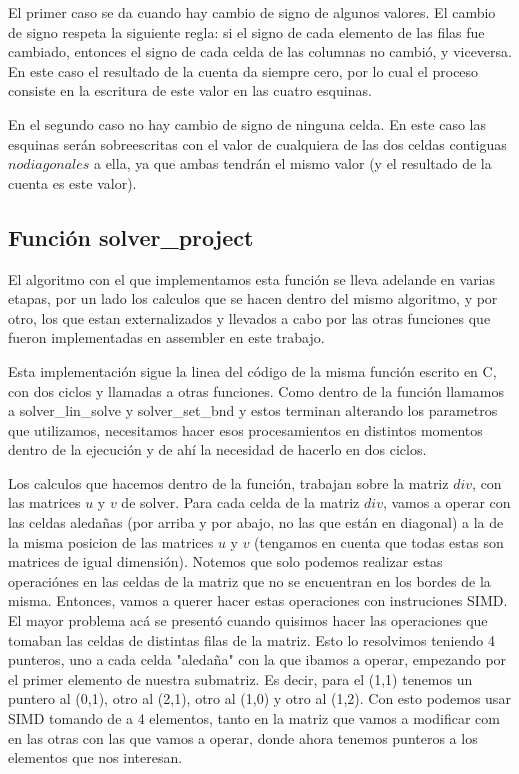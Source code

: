 \par El primer caso se da cuando hay cambio de signo de algunos valores. El cambio de signo respeta la siguiente regla: si el signo de cada elemento de las filas fue cambiado, entonces el signo de cada celda de las columnas no cambió, y viceversa. En este caso el resultado de la cuenta da siempre cero, por lo cual el proceso consiste en la escritura de este valor en las cuatro esquinas.\newline
\par En el segundo caso no hay cambio de signo de ninguna celda. En este caso las esquinas serán sobreescritas con el valor de cualquiera de las dos celdas contiguas \(no diagonales\) a ella, ya que ambas tendrán el mismo valor (y el resultado de la cuenta es este valor).\newline


\subsection{Función solver\_project}
\par El algoritmo con el que implementamos esta función se lleva adelande en varias etapas, por un lado los calculos que se hacen dentro del mismo algoritmo, y por otro, los que estan externalizados y llevados a cabo por las otras funciones que fueron implementadas en assembler en este trabajo.\newline

\par Esta implementación sigue la linea del código de la misma función escrito en C, con dos ciclos y llamadas a otras funciones. Como dentro de la función llamamos a solver\_lin\_solve y solver\_set\_bnd y estos terminan alterando los parametros que utilizamos, necesitamos hacer esos procesamientos en distintos momentos dentro de la ejecución y de ahí la necesidad de hacerlo en dos ciclos.\newline

\par Los calculos que hacemos dentro de la función, trabajan sobre la matriz $div$, con las matrices $u$ y $v$ de solver. Para cada celda de la matriz $div$, vamos a operar con las celdas aledañas (por arriba y por abajo, no las que están en diagonal) a la de la misma posicion de las matrices $u$ y $v$ (tengamos en cuenta que todas estas son matrices de igual dimensión).
Notemos que solo podemos realizar estas operaciónes en las celdas de la matriz que no se encuentran en los bordes de la misma.
Entonces, vamos a querer hacer estas operaciones con instruciones SIMD.
El mayor problema acá se presentó cuando quisimos hacer las operaciones que tomaban las celdas de distintas filas de la matriz.
Esto lo resolvimos teniendo 4 punteros, uno a cada celda "aledaña" con la que ibamos a operar, empezando por el primer elemento de nuestra submatriz. Es decir, para el (1,1) tenemos un puntero al (0,1), otro al (2,1), otro al (1,0) y otro al (1,2).
Con esto podemos usar SIMD tomando de a 4 elementos, tanto en la matriz que vamos a modificar com en las otras con las que vamos a operar, donde ahora tenemos punteros a los elementos que nos interesan.
\newline

